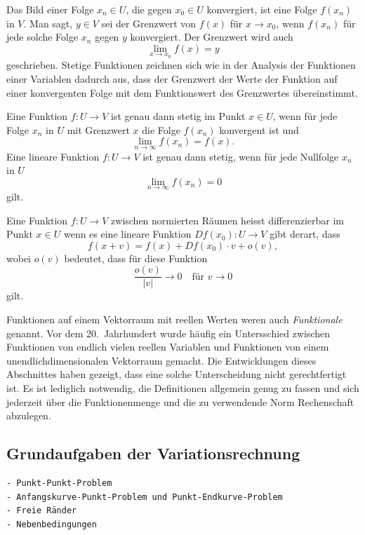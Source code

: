 Das Bild einer Folge $x_n\in U$, die gegen $x_0\in U$ konvergiert,
ist eine Folge $f(x_n)$ in $V$.
Man sagt, $y\in V$ sei der Grenzwert von $f(x)$ für $x\to x_0$,
wenn $f(x_n)$ für jede solche Folge $x_n$ gegen $y$ konvergiert.
Der Grenzwert wird auch
\[
\lim_{x\to x_0} f(x)
=
y
\]
geschrieben.
Stetige Funktionen zeichnen sich wie in der Analysis der Funktionen
einer Variablen dadurch aus, dass der Grenzwert der Werte der Funktion
auf einer konvergenten Folge mit dem Funktionswert des Grenzwertes
übereinstimmt.

\begin{satz}
Eine Funktion $f\colon U\to V$ ist genau dann stetig im Punkt $x\in U$,
wenn für jede Folge $x_n$ in $U$ mit Grenzwert $x$ die Folge $f(x_n)$
konvergent ist und
\[
\lim_{n\to\infty} f(x_n) = f(x).
\]
Eine lineare Funktion $f\colon U\to V$ ist genau dann stetig,
wenn für jede Nullfolge $x_n$ in $U$ 
\[
\lim_{n\to \infty} f(x_n) = 0
\]
gilt.
\end{satz}

\begin{definition}
Eine Funktion $f\colon U\to V$ zwischen normierten Räumen heisst
differenzierbar im Punkt $x\in U$ wenn es eine lineare Funktion
$Df(x_0)\colon U\to V$ gibt derart, dass
\[
f(x+v) =f(x) + Df(x_0)\cdot v + o(v),
\]
wobei $o(v)$ bedeutet, dass für diese Funktion
\[
\frac{o(v)}{|v|}\to 0
\quad\text{für $v\to 0$}
\]
gilt.
\end{definition}

Funktionen auf einem Vektorraum mit reellen Werten weren auch
{\em Funktionale} genannt.
Vor dem 20.~Jahrhundert wurde häufig ein Untersschied zwischen
Funktionen von endlich vielen reellen Variablen und Funktionen
von einem unendlichdimensionalen Vektorraum gemacht.
Die Entwicklungen dieses  Abschnittes haben gezeigt, dass eine
solche Unterscheidung nicht gerechtfertigt ist.
Es ist lediglich notwendig, die Definitionen allgemein genug zu
fassen und sich jederzeit über die Funktionenmenge und die zu
verwendende Norm Rechenschaft abzulegen.

%
%
\subsection{Grundaufgaben der Variationsrechnung}

\begin{verbatim}
- Punkt-Punkt-Problem
- Anfangskurve-Punkt-Problem und Punkt-Endkurve-Problem
- Freie Ränder
- Nebenbedingungen
\end{verbatim}


